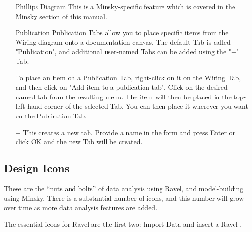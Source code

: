 \begin{itemize}
\item[Phillips Diagram]
This is a Minsky-specific feature which is covered in the Minsky section of this manual.
\item[Publication]
Publication Tabs allow you to place specific items from the Wiring diagram onto a documentation canvas. The default Tab is called "Publication", and additional user-named Tabs can be added using the "+" Tab.

To place an item on a Publication Tab, right-click on it on the Wiring Tab, and then click on "Add item to a publication tab". Click on the desired named tab from the resulting menu. The item will then be placed in the top-left-hand corner of the selected Tab. You can then place it wherever you want on the Publication Tab.

\item[+]
This creates a new tab. Provide a name in the form and press Enter or click OK and the new Tab will be created.
\end{itemize}


\subsection{Design Icons}


These are the ``nuts and bolts'' of data analysis using Ravel, and model-building using Minsky. There is a substantial number of icons, and this number will grow over time as more data analysis features are added.

The essential icons for Ravel are the first two: Import Data  and insert a Ravel . 

